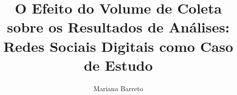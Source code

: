 \documentclass[msc,brazilian,digital]{thesispuc}
\author{Mariana Barreto}
\title{O Efeito do Volume de Coleta sobre os Resultados de Análises: Redes Sociais Digitais como Caso de Estudo}
\begin{document}
  
  \arial
  
  
\end{document}
